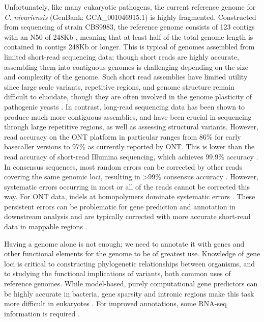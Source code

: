 Unfortunately, like many eukaryotic pathogens, the current reference genome for \textit{C. nivariensis} (GenBank: GCA\_001046915.1) is highly fragmented. Constructed from sequencing of strain CBS9983, the reference genome consists of 123 contigs with an N50 of 248Kb \citep{Gabaldon2013-bk}, meaning that at least half of the total genome length is contained in contigs 248Kb or longer. This is typical of genomes assembled from limited short-read sequencing data; though short reads are highly accurate, assembling them into contiguous genomes is challenging depending on the size and complexity of the genome. Such short read assemblies have limited utility since large scale variants, repetitive regions, and genome structure remain difficult to elucidate, though they are often involved in the genome plasticity of pathogenic yeasts \citep{Carrete2018-xm}. In contrast, long-read sequencing data has been shown to produce much more contiguous assemblies, and have been crucial in sequencing through large repetitive regions, as well as assessing structural variants. However, read accuracy on the ONT platform in particular ranges from 86\% for early basecaller versions \citep{Wick2019-pa} to 97\% as currently reported by ONT.  This is lower than the read accuracy of short-read Illumina sequencing, which achieves 99.9\% accuracy \citep{Fox2014-li}.  In consensus sequences, most random errors can be corrected by other reads covering the same genomic loci, resulting in >99\% consensus accuracy \citep{Wick2019-pa}. However, systematic errors occurring in most or all of the reads cannot be corrected this way. For ONT data, indels at homopolymers dominate systematic errors \citep{Wick2019-pa}. These persistent errors can be problematic for gene prediction and annotation in downstream analysis \citep{Watson2019-tk} and are typically corrected with more accurate short-read data in mappable regions \citep{Garrison2012-iq, Walker2014-eh, Vaser2017-zk}.

Having a genome alone is not enough; we need to annotate it with genes and other functional elements for the genome to be of greatest use. Knowledge of gene loci is critical to constructing phylogenetic relationships between organisms, and to studying the functional implications of variants, both common uses of reference genomes. While model-based, purely computational gene predictors can be highly accurate in bacteria, gene sparsity and intronic regions make this task more difficult in eukaryotes \citep{Salzberg2019-hw}. For improved annotations, some RNA-seq information is required \citep{Salzberg2019-hw}.

